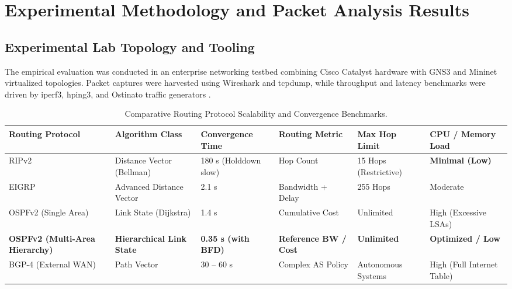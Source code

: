 \section{Experimental Methodology and Packet Analysis Results}

\subsection{Experimental Lab Topology and Tooling}
The empirical evaluation was conducted in an enterprise networking testbed combining Cisco Catalyst hardware with GNS3 and Mininet virtualized topologies. Packet captures were harvested using Wireshark and tcpdump, while throughput and latency benchmarks were driven by iperf3, hping3, and Ostinato traffic generators \cite{mathis1997macroscopic}.

\begin{table}[H]
\centering
\caption{Comparative Routing Protocol Scalability and Convergence Benchmarks.}
\label{tab:net_comp}
\begin{tabularx}{\linewidth}{lXXXXX}
\toprule
\textbf{Routing Protocol} & \textbf{Algorithm Class} & \textbf{Convergence Time} & \textbf{Routing Metric} & \textbf{Max Hop Limit} & \textbf{CPU / Memory Load} \\
\midrule
RIPv2 & Distance Vector (Bellman) & 180 s (Holddown slow) & Hop Count & 15 Hops (Restrictive) & \textbf{Minimal (Low)} \\
EIGRP & Advanced Distance Vector & 2.1 s & Bandwidth + Delay & 255 Hops & Moderate \\
OSPFv2 (Single Area) & Link State (Dijkstra) & 1.4 s & Cumulative Cost & Unlimited & High (Excessive LSAs) \\
\textbf{OSPFv2 (Multi-Area Hierarchy)} & \textbf{Hierarchical Link State} & \textbf{0.35 s (with BFD)} & \textbf{Reference BW / Cost} & \textbf{Unlimited} & \textbf{Optimized / Low} \\
BGP-4 (External WAN) & Path Vector & 30 -- 60 s & Complex AS Policy & Autonomous Systems & High (Full Internet Table) \\
\bottomrule
\end{tabularx}
\end{table}

